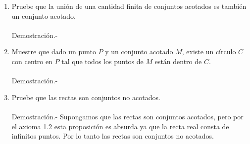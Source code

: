 \begin{enumerate}
    \item Pruebe que la unión de una cantidad finita de conjuntos acotados es también un conjunto acotado.\\\\
    Demostración.-\;

    \item Muestre que dado un punto $P$ y un conjunto acotado $M$, existe un círculo $C$ con centro en $P$ tal que todos los puntos de $M$ están dentro de $C.$\\\\
    Demostración.-\;

    \item Pruebe que las rectas son conjuntos no acotados.\\\\
    Demostración.-\; Supongamos que las rectas son conjuntos acotados, pero por el axioma 1.2 esta proposición es absurda ya que la recta real consta de infinitos puntos. Por lo tanto las rectas son conjuntos no acotados.\\\\

\end{enumerate}
